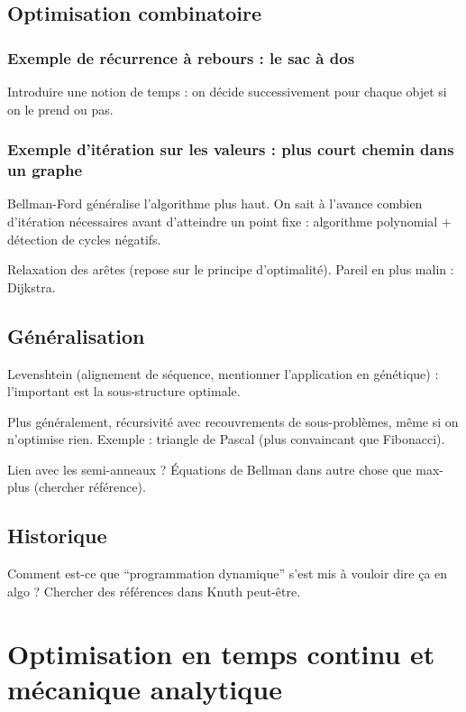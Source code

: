 \documentclass[a4paper, 11pt]{article}
\begin{document}
\subsection{Optimisation combinatoire}

\subsubsection{Exemple de récurrence à rebours : le sac à dos}

Introduire une notion de temps : on décide successivement pour chaque objet si
on le prend ou pas.

\subsubsection{Exemple d'itération sur les valeurs : plus court chemin dans un
  graphe}

Bellman-Ford généralise l'algorithme plus haut.
On sait à l'avance combien d'itération nécessaires avant d'atteindre un point
fixe : algorithme polynomial + détection de cycles négatifs.

Relaxation des arêtes (repose sur le principe d'optimalité). Pareil en plus
malin : Dijkstra.

\subsection{Généralisation}

Levenshtein (alignement de séquence, mentionner l'application en génétique) :
l'important est la sous-structure optimale.

Plus généralement, récursivité avec recouvrements de sous-problèmes, même si on
n'optimise rien. Exemple : triangle de Pascal (plus convaincant que Fibonacci).

Lien avec les semi-anneaux ? Équations de Bellman dans autre chose que max-plus
(chercher référence).

\subsection{Historique}

Comment est-ce que \enquote{programmation dynamique} s'est mis à vouloir dire ça
en algo ? Chercher des références dans Knuth peut-être.

\section{Optimisation en temps continu et mécanique analytique}
\end{document}
